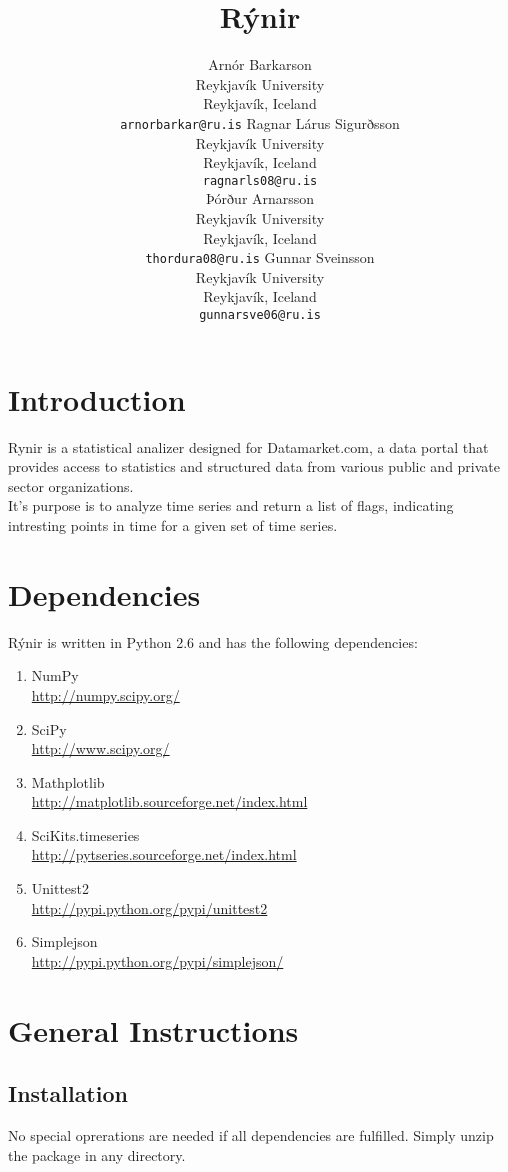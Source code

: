 \documentclass[11pt]{article}
\title{Rýnir}
\author{Arnór Barkarson\\
  Reykjavík University\\
  Reykjavík, Iceland\\
  {\tt arnorbarkar@ru.is}  \And
  Ragnar Lárus Sigurðsson\\
  Reykjavík University\\
  Reykjavík, Iceland\\
  {\tt  ragnarls08@ru.is}\\  \And
  Þórður Arnarsson\\
  Reykjavík University\\
  Reykjavík, Iceland\\
  {\tt  thordura08@ru.is}  \And
  Gunnar Sveinsson\\
  Reykjavík University\\
  Reykjavík, Iceland\\
  {\tt  gunnarsve06@ru.is} 
}
\date{}
\begin{document}
\maketitle

\section{Introduction}
Rynir is a statistical analizer designed for Datamarket.com, 
a data portal that provides access to statistics and structured data from various public and private sector organizations.\\ 
It's purpose is to analyze time series and return a list of flags, 
indicating intresting points in time for a given set of time series. 

 
\section{Dependencies}
Rýnir is written in Python 2.6 and has the following dependencies:\\
\renewcommand{\theenumi}{\roman{enumi}}
\renewcommand{\labelenumi}{\theenumi}
\begin{enumerate}
 \item NumPy\\ \url{http://numpy.scipy.org/}
 \item SciPy\\ \url{http://www.scipy.org/}
 \item Mathplotlib\\ \url{http://matplotlib.sourceforge.net/index.html}
 \item SciKits.timeseries\\ \url{http://pytseries.sourceforge.net/index.html}
 \item Unittest2\\ \url{http://pypi.python.org/pypi/unittest2}
 \item Simplejson\\ \url{http://pypi.python.org/pypi/simplejson/}
\end{enumerate}

\section{General Instructions}


\subsection{Installation}
No special oprerations are needed if all dependencies are fulfilled. Simply unzip the package in any directory.
\end{document}
